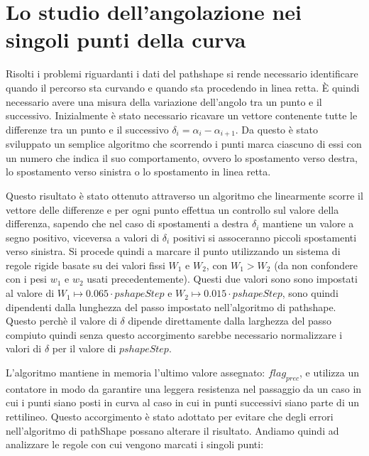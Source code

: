 \section{Lo studio dell'angolazione nei singoli punti della curva}

    Risolti i problemi riguardanti i dati del pathshape si rende necessario identificare quando il percorso sta curvando e quando sta procedendo in linea retta. È quindi necessario avere una misura della variazione dell'angolo  tra un punto e il successivo. Inizialmente è stato necessario ricavare un vettore contenente tutte le differenze  tra un punto e il successivo $\delta_{i} = \alpha_i-\alpha_{i+1}$. Da questo è stato sviluppato un semplice algoritmo che scorrendo i punti marca ciascuno di essi con un numero che indica il suo comportamento, ovvero lo spostamento verso destra, lo spostamento verso sinistra o lo spostamento in linea retta.

    Questo risultato è stato ottenuto attraverso un algoritmo che linearmente scorre il vettore delle differenze e per ogni punto effettua un controllo sul valore della differenza, sapendo che nel caso di spostamenti a destra $\delta_i$ mantiene un valore a segno positivo, viceversa a valori di $\delta_i$ positivi si assoceranno piccoli spostamenti verso sinistra. Si procede quindi a marcare il punto utilizzando un sistema di regole rigide basate su dei valori fissi \(W_1\) e \(W_2\), con \(W_1>W_2\) (da non confondere con i pesi $w_1$ e $w_2$ usati precedentemente). Questi due valori sono sono impostati al valore di \(W_1 \mapsto 0.065 \cdot pshapeStep\) e \(W_2 \mapsto 0.015 \cdot pshapeStep \), sono quindi dipendenti dalla lunghezza del passo impostato nell'algoritmo di pathshape. Questo perchè il valore di $\delta$ dipende direttamente dalla larghezza del passo compiuto quindi senza questo accorgimento sarebbe necessario normalizzare i valori di $\delta$ per il valore di $pshapeStep$.

    L'algoritmo mantiene in memoria l'ultimo valore assegnato: $flag_{prec}$, e utilizza un contatore in modo da garantire una leggera resistenza nel passaggio da un caso in cui i punti siano posti in curva al caso in cui in punti successivi siano parte di un rettilineo. Questo accorgimento è stato adottato per evitare che degli errori nell'algoritmo di pathShape possano alterare il risultato. Andiamo quindi ad analizzare le regole con cui vengono marcati i singoli punti:

